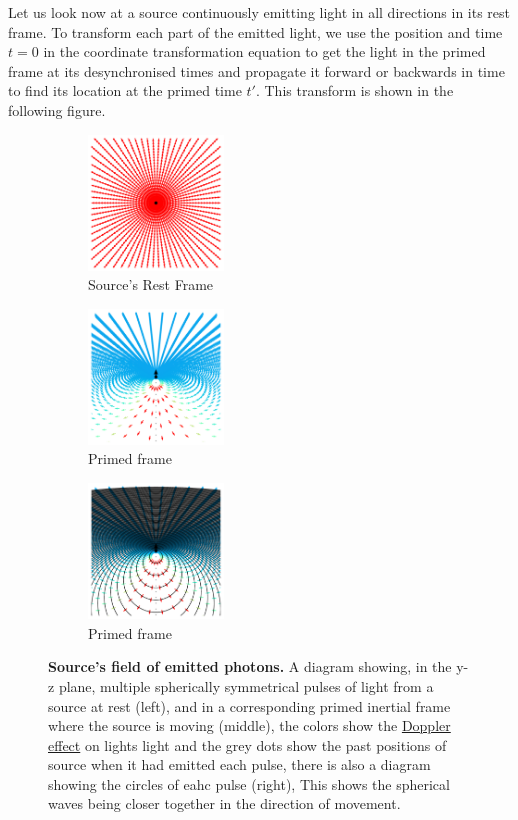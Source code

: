 Let us look now at a source continuously emitting light in all directions in its rest frame.
To transform each part of the emitted light, we use the position and time ${t}=0$ in the coordinate transformation equation to get the light in the primed frame at its desynchronised times and propagate it forward or backwards in time to find its location at the primed time ${t{'}}$.
This transform is shown in the following figure.

\begin{figure}[H]
	\centering
	\begin{subfigure}{.3\textwidth}
		\centering
		\includegraphics[width = 3.6cm]{images/pdf/Field_Rest_Frame.pdf}
		\caption{Source's Rest Frame}
	\end{subfigure}
	\begin{subfigure}{.3\textwidth}
		\centering
		\includegraphics[width = 3.6cm]{images/pdf/Field_Moving_Frame_Doppler.pdf}
		\caption{Primed frame}
	\end{subfigure}
	\begin{subfigure}{.3\textwidth}
		\centering
		\includegraphics[width = 3.6cm]{images/pdf/Field_Moving_Frame_Doppler_circles.pdf}
		\caption{Primed frame}
	\end{subfigure}
	\caption{\textbf{Source's field of emitted photons.} A diagram showing, in the y-z plane, multiple spherically symmetrical pulses of light from a source at rest (left), and in a corresponding primed inertial frame where the source is moving (middle), the colors show the \protect\hyperlink{def-doppler-effect}{Doppler effect} on lights light and the grey dots show the past positions of source when it had emitted each pulse, there is also a diagram showing the circles of eahc pulse (right), This shows the spherical waves being closer together in the direction of movement.}
	\label{fig: full field transformation}
\end{figure}

